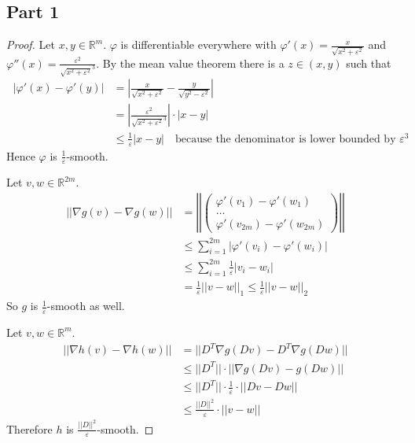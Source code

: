 \documentclass[10pt,a4paper]{article}
\begin{document}
\subsection*{Part 1}

\begin{proof}
  Let $x, y \in \mathbb{R}^{m}$.
  $\varphi$ is differentiable everywhere with $\varphi'(x) = \frac{x}{\sqrt{x^{2} + \varepsilon^{2}}}$ and $\varphi''(x) = \frac{\varepsilon^{2}}{\sqrt{x^{2} + \varepsilon^{2}}^{3}}$.
  By the mean value theorem there is a $z \in (x, y)$ such that
  \begin{align*}
    ~|\varphi'(x) - \varphi'(y)| & = \left| \frac{x}{\sqrt{x^{2} + \varepsilon^{2}}} - \frac{y}{\sqrt{y^{2} - \varepsilon^{2}}} \right|\\
                                 & = \left| \frac{\varepsilon^{2}}{\sqrt{x^{2} + \varepsilon^{2}}^{3}} \right| \cdot |x - y|\\
                                 & \le \frac{1}{\varepsilon}|x - y| \quad \text{because the denominator is lower bounded by $\varepsilon^3$}
  \end{align*}
  Hence $\varphi$ is $\frac{1}{\varepsilon}$-smooth.

  Let $v, w \in \mathbb{R}^{2m}$.
  \begin{align*}
    ~||\nabla g(v) - \nabla g(w)|| & = \left|\left| \begin{pmatrix}\varphi'(v_{1}) - \varphi'(w_{1})\\\hdots\\\varphi'(v_{2m}) - \varphi'(w_{2m})\end{pmatrix} \right|\right|\\
                                   & \le \sum_{i = 1}^{2m} |\varphi'(v_{i}) - \varphi'(w_{i})|\\
                                   & \le \sum_{i = 1}^{2m} \frac{1}{\varepsilon}|v_{i} - w_{i}|\\
                                   & = \frac{1}{\varepsilon}||v - w||_{1} \le \frac{1}{\varepsilon}||v - w||_{2}
  \end{align*}
  So $g$ is $\frac{1}{\varepsilon}$-smooth as well.

  Let $v, w \in \mathbb{R}^{m}$.
  \begin{align*}
    ~||\nabla h(v) - \nabla h(w)|| & = ||D^{T}\nabla g(Dv) - D^{T}\nabla g(Dw)||\\
                                   & \le ||D^{T}|| \cdot ||\nabla g(Dv) - g(Dw)||\\
                                   & \le ||D^{T}|| \cdot \frac{1}{\varepsilon} \cdot ||Dv - Dw||\\
                                   & \le \frac{||D||^{2}}{\varepsilon} \cdot ||v - w||
  \end{align*}
  Therefore $h$ is $\frac{||D||^{2}}{\varepsilon}$-smooth.


\end{proof}
\end{document}
